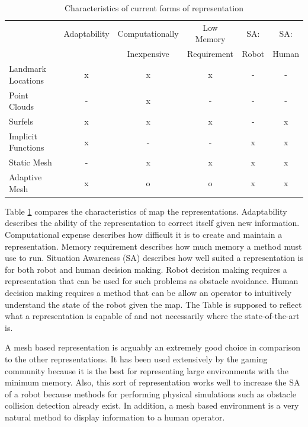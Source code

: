 \documentclass[12pt]{article}
\begin{document}
\begin{table}[h]
\begin{footnotesize}
\begin{center}
\begin{tabular}{|l|c|c|c|c|c|}
\hline
\multirow{2}{*}{} & Adaptability & Computationally & Low Memory & SA: & SA: \\
 & & Inexpensive & Requirement & Robot & Human \\\hline
Landmark Locations  	& x & x & x & - & - \\
Point Clouds		& - & x & - & - & - \\
Surfels             	& x & x & x & - & x \\
Implicit Functions 	& x & - & - & x & x \\
Static Mesh	 	& - & x & x & x & x \\
Adaptive Mesh	 	& x & o & o & x & x \\
\hline
\end{tabular}
\end{center}
\end{footnotesize}
\caption{Characteristics of current forms of representation}
\label{tab:rep}
\end{table}

Table \ref{tab:rep} compares the characteristics of map the
representations. Adaptability describes the ability of the representation
to correct itself given new information. Computational expense describes
how difficult it is to create and maintain a representation.  Memory
requirement describes how much memory a method must use to run.  Situation
Awareness (SA) describes how well suited a representation is for both robot
and human decision making. Robot decision making requires a representation
that can be used for such problems as obstacle avoidance. Human decision
making requires a method that can be allow an operator to intuitively
understand the state of the robot given the map. The Table is supposed to
reflect what a representation is capable of and not necessarily where the
state-of-the-art is. 

A mesh based representation is arguably an extremely good choice in
comparison to the other representations. It has been used extensively by
the gaming community because it is the best for representing large
environments with the minimum memory. Also, this sort of representation
works well to increase the SA of a robot because methods for performing
physical simulations such as obstacle collision detection already exist. In
addition, a mesh based environment is a very natural method to display
information to a human operator.
\end{document}
